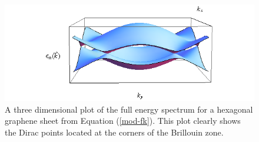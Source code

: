 			\begin{figure}[h]
				\centerline{\includegraphics[scale=0.6]{images/tight-binding}}	
				\caption{A three dimensional plot of the full energy spectrum for a hexagonal graphene sheet from Equation (\ref{mod-fk}). This plot clearly shows the Dirac points located at the corners of the Brillouin zone.}
				\label{introduction-fk-plot}
			\end{figure}
